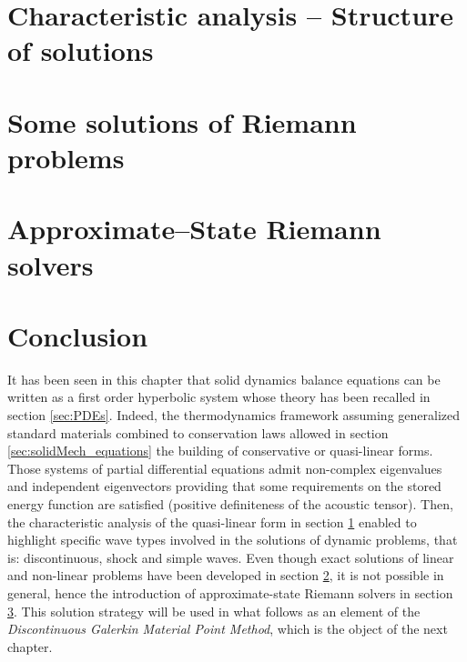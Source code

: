 \section{Characteristic analysis -- Structure of solutions}
\label{sec:characteristic_analysis}


\section{Some solutions of Riemann problems}
\label{sec:riemann_problems}

\section{Approximate--State Riemann solvers}
\label{sec:riemann_solvers}


\section*{Conclusion}
It has been seen in this chapter that solid dynamics balance equations can be written as a first order hyperbolic system whose theory has been recalled in section \ref{sec:PDEs}. Indeed, the thermodynamics framework assuming generalized standard materials combined to conservation laws allowed in section \ref{sec:solidMech_equations} the building of conservative or quasi-linear forms. Those systems of partial differential equations admit non-complex eigenvalues and independent eigenvectors providing that some requirements on the stored energy function are satisfied (positive definiteness of the acoustic tensor). Then, the characteristic analysis of the quasi-linear form in section \ref{sec:characteristic_analysis} enabled to highlight specific wave types involved in the solutions of dynamic problems, that is: discontinuous, shock and simple waves. Even though exact solutions of linear and non-linear problems have been developed in section \ref{sec:riemann_problems}, it is not possible in general, hence the introduction of approximate-state Riemann solvers in section \ref{sec:riemann_solvers}. This solution strategy will be used in what follows as an element of the \textit{Discontinuous Galerkin Material Point Method}, which is the object of the next chapter.

